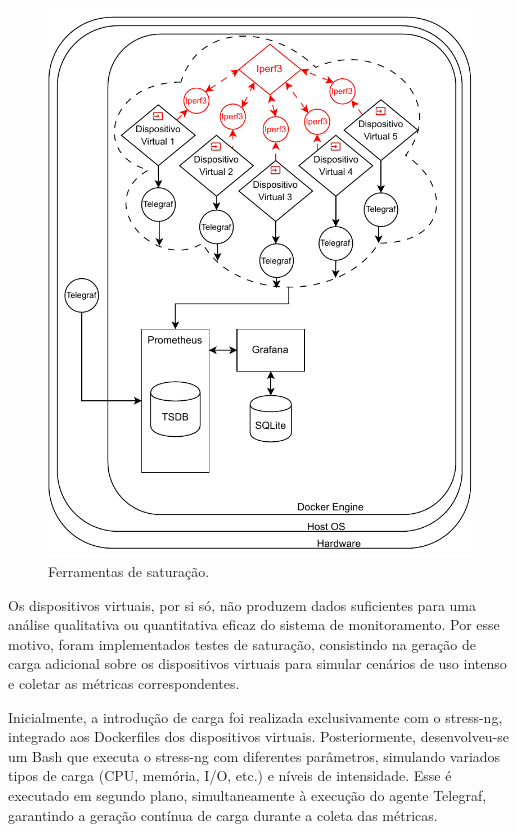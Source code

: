 \begin{figure}[H]
\centering
\includegraphics[scale=1]{Imagens/chap03/by-blocks/saturation_diagram.pdf}
\caption{Ferramentas de saturação.}
\label{fig:DiagramaSaturacao}
\end{figure}

Os dispositivos virtuais, por si só, não produzem dados suficientes para uma análise qualitativa ou quantitativa eficaz do sistema de monitoramento. Por esse motivo, foram implementados testes de saturação, consistindo na geração de carga adicional sobre os dispositivos virtuais para simular cenários de uso intenso e coletar as métricas correspondentes.

Inicialmente, a introdução de carga foi realizada exclusivamente com o stress-ng, integrado aos Dockerfiles dos dispositivos virtuais. Posteriormente, desenvolveu-se um  Bash que executa o stress-ng com diferentes parâmetros, simulando variados tipos de carga (CPU, memória, I/O, etc.) e níveis de intensidade. Esse  é executado em segundo plano, simultaneamente à execução do agente Telegraf, garantindo a geração contínua de carga durante a coleta das métricas.

